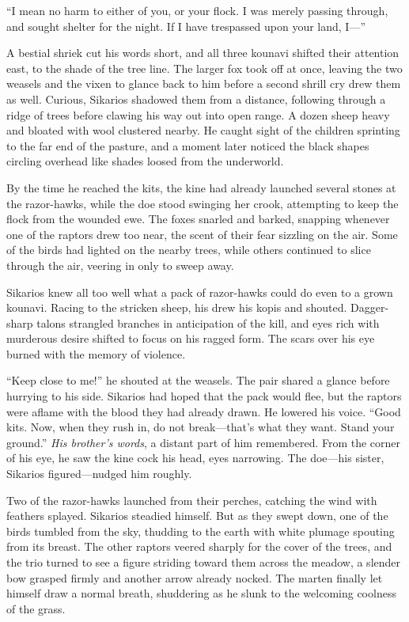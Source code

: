 ``I mean no harm to either of you, or your flock. I was merely passing through, and sought shelter for the night. If I have trespassed upon your land, I---''

A bestial shriek cut his words short, and all three kounavi shifted their attention east, to the shade of the tree line. The larger fox took off at once, leaving the two weasels and the vixen to glance back to him before a second shrill cry drew them as well. Curious, Sikarios shadowed them from a distance, following through a ridge of trees before clawing his way out into open range. A dozen sheep heavy and bloated with wool clustered nearby. He caught sight of the children sprinting to the far end of the pasture, and a moment later noticed the black shapes circling overhead like shades loosed from the underworld.

By the time he reached the kits, the kine had already launched several stones at the razor-hawks, while the doe stood swinging her crook, attempting to keep the flock from the wounded ewe. The foxes snarled and barked, snapping whenever one of the raptors drew too near, the scent of their fear sizzling on the air. Some of the birds had lighted on the nearby trees, while others continued to slice through the air, veering in only to sweep away.

Sikarios knew all too well what a pack of razor-hawks could do even to a grown kounavi. Racing to the stricken sheep, his drew his kopis and shouted. Dagger-sharp talons strangled branches in anticipation of the kill, and eyes rich with murderous desire shifted to focus on his ragged form. The scars over his eye burned with the memory of violence.

``Keep close to me!'' he shouted at the weasels. The pair shared a glance before hurrying to his side. Sikarios had hoped that the pack would flee, but the raptors were aflame with the blood they had already drawn. He lowered his voice. ``Good kits. Now, when they rush in, do not break---that's what they want. Stand your ground.'' \emph{His brother's words}, a distant part of him remembered. From the corner of his eye, he saw the kine cock his head, eyes narrowing. The doe---his sister, Sikarios figured---nudged him roughly.

Two of the razor-hawks launched from their perches, catching the wind with feathers splayed. Sikarios steadied himself. But as they swept down, one of the birds tumbled from the sky, thudding to the earth with white plumage spouting from its breast. The other raptors veered sharply for the cover of the trees, and the trio turned to see a figure striding toward them across the meadow, a slender bow grasped firmly and another arrow already nocked. The marten finally let himself draw a normal breath, shuddering as he slunk to the welcoming coolness of the grass.

